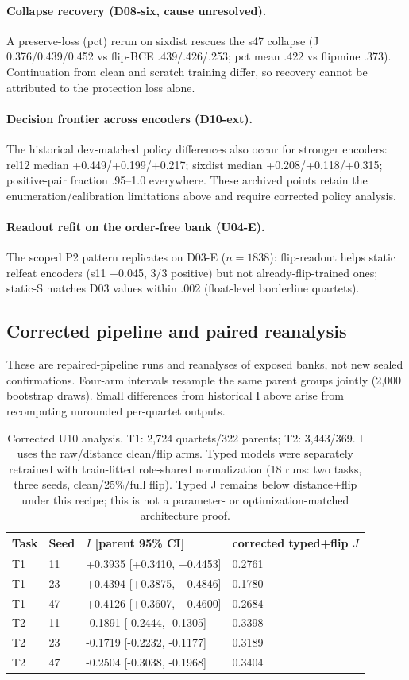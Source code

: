 \paragraph{Collapse recovery (D08-six, cause unresolved).} A preserve-loss (pct) rerun on sixdist rescues the s47 collapse (J 0.376/0.439/0.452 vs flip-BCE .439/.426/.253; pct mean .422 vs flipmine .373). Continuation from clean and scratch training differ, so recovery cannot be attributed to the protection loss alone.
\paragraph{Decision frontier across encoders (D10-ext).} The historical dev-matched policy differences also occur for stronger encoders: rel12 median +0.449/+0.199/+0.217; sixdist median +0.208/+0.118/+0.315; positive-pair fraction .95--1.0 everywhere. These archived points retain the enumeration/calibration limitations above and require corrected policy analysis.
\paragraph{Readout refit on the order-free bank (U04-E).} The scoped P2 pattern replicates on D03-E ($n{=}1838$): flip-readout helps static relfeat encoders (s11 +0.045, 3/3 positive) but not already-flip-trained ones; static-S matches D03 values within .002 (float-level borderline quartets).
\subsection{Corrected pipeline and paired reanalysis}
These are repaired-pipeline runs and reanalyses of exposed banks, not new sealed confirmations. Four-arm intervals resample the same parent groups jointly (2,000 bootstrap draws). Small differences from historical I above arise from recomputing unrounded per-quartet outputs.
\begin{table}[t]\centering\small
\begin{tabular}{@{}llll@{}}\toprule
Task & Seed & $I$ [parent 95\% CI] & corrected typed+flip $J$ \\
\midrule
T1 & 11 & +0.3935 [+0.3410, +0.4453] & 0.2761 \\
T1 & 23 & +0.4394 [+0.3875, +0.4846] & 0.1780 \\
T1 & 47 & +0.4126 [+0.3607, +0.4600] & 0.2684 \\
T2 & 11 & -0.1891 [-0.2444, -0.1305] & 0.3398 \\
T2 & 23 & -0.1719 [-0.2232, -0.1177] & 0.3189 \\
T2 & 47 & -0.2504 [-0.3038, -0.1968] & 0.3404 \\
\bottomrule\end{tabular}
\caption{Corrected U10 analysis. T1: 2,724 quartets/322 parents; T2: 3,443/369. I uses the raw/distance clean/flip arms. Typed models were separately retrained with train-fitted role-shared normalization (18 runs: two tasks, three seeds, clean/25\%/full flip). Typed J remains below distance+flip under this recipe; this is not a parameter- or optimization-matched architecture proof.}\label{tab:u10fixed}\end{table}
